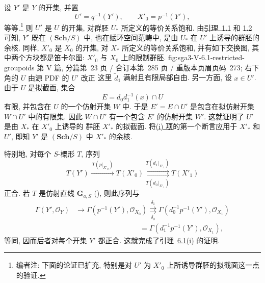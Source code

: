 
设 \(Y'\) 是 \(Y\) 的开集, 并置
\[
  U'=q^{-1}(Y'),\qquad X'_0=p^{-1}(Y'),
\]
等等.\footnote{\label{note:sga3-V-33}编者注: 下面的论证已扩充,
特别是对 \(U'\) 为 \(X'_0\) 上所诱导群胚的拟截面这一点的验证.}
则 \(U'\) 是 \(U\) 的开集, 对群胚 \(U_\ast\) 所定义的等价关系饱和.
由\hyperref[lem:sga3-V-1.1]{引理~1.1} 和
\hyperref[sga3:exp5:lemma:1.2]{1.2} 可知, \(Y'\)
既在 \((\mathbf{Sch}/S)\) 中, 也在赋环空间范畴中,
是由 \(U_\ast\) 在 \(U'\) 上诱导的群胚的余核.
同样, \(X'_0\) 是 \(X_0\) 的开集, 对 \(X_\ast\) 所定义的等价关系饱和,
并有如下交换图, 其中两个方块都是笛卡尔图:
  {\(X'_0\) 与 \(X_0\) 上的限制群胚.}
  {fig:sga3-V-6.1-restricted-groupoids}
  {第 V 篇, 分篇第~23 页 / 合订本第~285 页 / 重版本页眉页码~273;
  右下角的 \(U\) 由源 PDF 的 \(U'\) 改正}
这里 \(\widetilde d_1\) 满射且有限局部自由.
另一方面, 设 \(x\in U'\). 由于 \(U\) 是拟截面, 集合
\[
  E=d_0d_1^{-1}(x)\cap U
\]
有限, 并包含在 \(U\) 的一个仿射开集 \(W\) 中.
于是 \(E'=E\cap U'\) 是包含在拟仿射开集 \(W\cap U'\) 中的有限集.
因此 \(W\cap U'\) 有一个包含 \(E'\) 的仿射开集 \(W'\).
这就证明了 \(U'\) 是由 \(X_\ast\) 在 \(X'_0\) 上诱导的
群胚 \(X'_\ast\) 的拟截面.
将\hyperref[lem:sga3-V-6.1-i]{(i) 项}的第一个断言应用于
\(X'_\ast\) 和 \(U'\), 即知 \(Y'\) 是 \((\mathbf{Sch}/S)\)
中 \(X'_\ast\) 的余核.

特别地, 对每个 \(S\)-概形 \(T\), 序列
\begin{equation}
  T(Y')
  \xrightarrow{\,T(p|_{X'_0})\,}
  T(X'_0)
  \underset{T(d_0|_{X'_1})}
    {\overset{T(d_1|_{X'_1})}{\rightrightarrows}}
  T(X'_1)
  \label{eq:sga3-V-6.1-T-exact}
\end{equation}
正合. 若 \(T\) 是仿射直线 \(\mathbf G_{a,S}\)
(), 则此序列与
\begin{equation}
\begin{aligned}
  \Gamma(Y',\mathcal O_Y)
  &\longrightarrow
  \Gamma(p^{-1}(Y'),\mathcal O_{X_0})
  \underset{\delta_0}{\overset{\delta_1}{\rightrightarrows}}
  \Gamma(d_0^{-1}p^{-1}(Y'),\mathcal O_{X_1})\\
  &\hspace{9em}=
  \Gamma(d_1^{-1}p^{-1}(Y'),\mathcal O_{X_1}),
\end{aligned}
\label{eq:sga3-V-6.1-sections-exact}
\end{equation}
等同, 因而后者对每个开集 \(Y'\) 都正合.
这就完成了引理~\hyperref[lem:sga3-V-6.1-i]{6.1(i)} 的证明.

